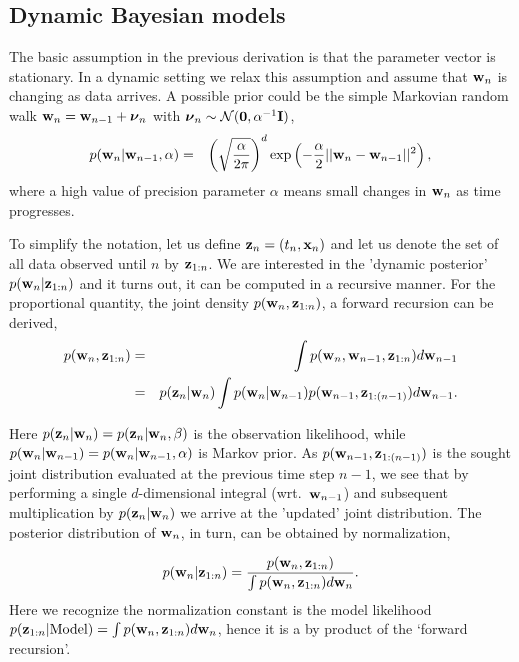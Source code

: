 \documentclass[A4,12pt]{article}    %
\def\xb{{\bf x}}
\def\zb{{\bf z}}
\def\wb{{\bf w}}
\def\nub{\text{\boldmath $\nu$}}
\def\xb{{\bf x}}
\begin{document}
\subsection*{Dynamic Bayesian models}
The basic assumption in the previous derivation is that the parameter vector is stationary. In a dynamic setting we relax this assumption and assume that $\wb_n$ is changing as data arrives. A possible prior could be the simple Markovian random walk  $\wb_n =  \wb_{n-1} + \nub_n$ with $\nub_n \sim \mathcal{N}({\bf 0},\alpha^{-1}{\bf I})$,
\begin{eqnarray}
 p(\wb_n|\wb_{n-1},\alpha) &=&  \left(\sqrt{\frac{\alpha}{2\pi}}\right)^{d} \exp\left(-\frac{\alpha}{2}||\wb_n-\wb_{n-1}||^2\right), \label{dynprior} \nonumber
\end{eqnarray}
where a high value of precision parameter $\alpha$ means small changes in $\wb_n$ as time progresses.

To simplify the notation, let us define $\zb_n =(t_n,\xb_n)$ and let us denote the set of all data observed until $n$ by $\zb_{1:n}$. We are interested in the 'dynamic posterior' $p(\wb_n|\zb_{1:n})$ and it turns out, it can be computed in a recursive manner. For the proportional quantity, the joint density $p(\wb_n ,\zb_{1:n})$, a forward recursion can be derived,
\begin{eqnarray}
 p(\wb_n ,\zb_{1:n}) &=& \int p(\wb_n ,\wb_{n-1}, \zb_{1:n})d\wb_{n-1} \label{dyn1} \\
      &=& p(\zb_{n}|\wb_n)\int p(\wb_n | \wb_{n-1})p( \wb_{n-1},\zb_{1:(n-1)})d\wb_{n-1} \label{dyn5}.
\end{eqnarray}

  Here $p(\zb_{n}|\wb_n)= p(\zb_{n}|\wb_n, \beta)$  is the observation likelihood, while $p(\wb_n | \wb_{n-1})=p(\wb_n | \wb_{n-1},\alpha)$ is Markov prior.
  As $p( \wb_{n-1},\zb_{1:(n-1)})$ is the sought joint distribution evaluated at the previous time step $n-1$, we see that by performing a single $d$-dimensional integral (wrt.\ $\wb_{n-1}$) and subsequent multiplication by $p(\zb_{n}|\wb_n)$ we arrive at the 'updated' joint distribution. The posterior distribution of $\wb_n$, in turn, can be obtained by normalization,

\begin{equation}
  p(\wb_n | \zb_{1:n})  = \frac{p(\wb_n ,\zb_{1:n})}{\int p(\wb_n ,\zb_{1:n}) d\wb_n}.
\end{equation}
Here we recognize the normalization constant is the model likelihood $p(\zb_{1:n} |{\rm Model} ) = \int p(\wb_n ,\zb_{1:n}) d\wb_n$, hence it is a by product of the `forward recursion'.
\end{document}
